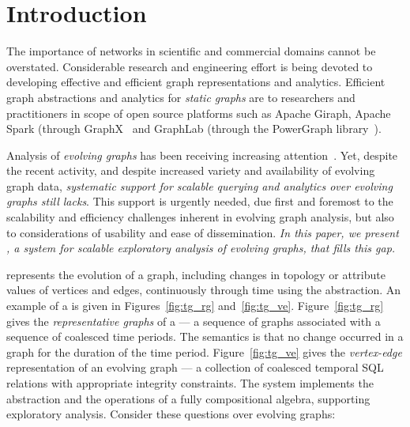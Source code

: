 \section{Introduction}
\label{sec:intro}

The importance of networks in scientific and commercial domains cannot
be overstated.  
Considerable research and engineering effort is being devoted to developing
effective and efficient graph representations and analytics.
Efficient graph abstractions and analytics for {\em static graphs} are
to researchers and practitioners in scope of open source platforms
such as Apache Giraph, Apache Spark (through
GraphX~\cite{DBLP:conf/osdi/GonzalezXDCFS14} and GraphLab (through
the PowerGraph library~\cite{DBLP:conf/osdi/GonzalezLGBG12}).

Analysis of {\em evolving graphs} has been receiving
increasing attention~\cite{DBLP:journals/csur/AggarwalS14,Chan2008,Kan2009,Miao2015,Ren2011,Semertzidis2015}.
%
Yet, despite the recent activity, and
despite increased variety and availability of evolving graph data,
{\em systematic support for scalable querying and analytics over
  evolving graphs still lacks}.  This support is urgently needed, due
first and foremost to the scalability and efficiency challenges
inherent in evolving graph analysis, but also to considerations of
usability and ease of dissemination.  {\em In this paper, we present
  \ql, a system for scalable exploratory analysis of evolving graphs,
  that fills this gap.}

\ql represents the evolution of a graph, including changes in topology 
or attribute values of vertices and edges, continuously through time
using the \tg abstraction.  An example of a \tg is given in
Figures~\ref{fig:tg_rg} and~\ref{fig:tg_ve}.  Figure~\ref{fig:tg_rg} gives the
{\em representative graphs} of a \tg --- a sequence of
graphs associated with a sequence of coalesced time periods.  The semantics
is that no change occurred in a graph for the duration of
the time period. Figure~\ref{fig:tg_ve} gives the {\em vertex-edge}
representation of an evolving graph --- a collection of coalesced
temporal SQL relations with appropriate integrity constraints.
The \ql system implements the \tg abstraction and the operations of a
fully compositional algebra, supporting exploratory analysis. 
Consider these questions over evolving graphs:

